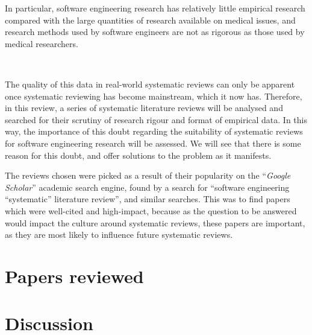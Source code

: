 \begin{displayquote}
    In particular, software engineering research has relatively little empirical research compared with the large quantities of research available on medical issues, and research methods used by software engineers are not as rigorous as those used by medical researchers.
\end{displayquote}~\cite{Kitchenham2004}

The quality of this data in real-world systematic reviews can only be apparent once systematic reviewing has become mainstream, which it now has. Therefore, in this review, a series of systematic literature reviews will be analysed and searched for their scrutiny of research rigour and format of empirical data. In this way, the importance of this doubt regarding the suitability of systematic reviews for software engineering research will be assessed. We will see that there is some reason for this doubt, and offer solutions to the problem as it manifests.\par

The reviews chosen were picked as a result of their popularity on the ``\emph{Google Scholar}'' academic search engine, found by a search for ``software engineering ``systematic'' literature review'', and similar searches. This was to find papers which were well-cited and high-impact, because as the question to be answered would impact the culture around systematic reviews, these papers are important, as they are most likely to influence future systematic reviews.\par


\section{Papers reviewed}








\section{Discussion}\label{sec:discussion}


